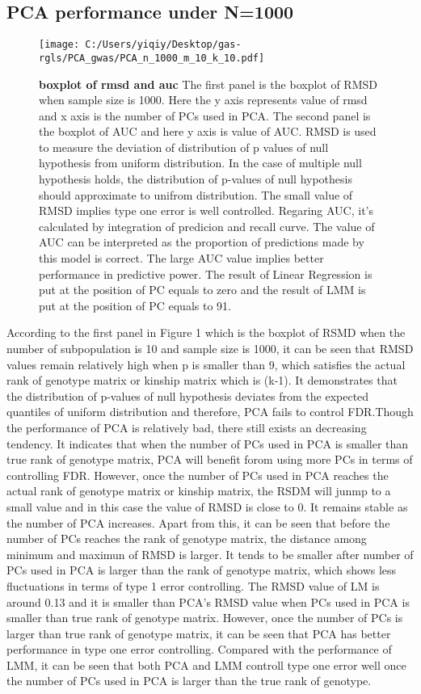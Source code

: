 \documentclass[12pt]{article}
\begin{document}
\subsection{PCA performance under N=1000}
\begin{figure}[bp!]
  \centering
  \texttt{[image: C:/Users/yiqiy/Desktop/gas-rgls/PCA\_gwas/PCA\_n\_1000\_m\_10\_k\_10.pdf]}
  \caption{
    {\bf boxplot of rmsd and auc}
    The first panel is the boxplot of RMSD when sample size is 1000. Here the y axis represents value of rmsd and x axis is the number of PCs used in PCA.
    The second panel is the boxplot of AUC and here y axis is value of AUC. RMSD is used to measure the deviation of distribution of p values of null hypothesis from uniform distribution. In the case of multiple null hypothesis holds, the distribution of p-values of null hypothesis should approximate to unifrom distribution. The small value of RMSD implies type one error is well controlled. Regaring AUC, it's calculated by integration of predicion and recall curve. The value of AUC can be interpreted as the proportion of predictions made by this model is correct. The large AUC value implies better performance in predictive power. The result of Linear Regression is put at the position of PC equals to zero and the result of LMM is put at the position of PC equals to 91.}
  \label{fig:example}
\end{figure}

According to the first panel in Figure 1 which is the boxplot of RSMD when the number of subpopulation is 10 and sample size is 1000, it can be seen that RMSD values remain relatively high when p is smaller than 9, which satisfies the actual rank of genotype matrix or kinship matrix which is (k-1). It demonstrates that the distribution of p-values of null hypothesis deviates from the expected quantiles of uniform distribution and therefore, PCA fails to control FDR.Though the performance of PCA is relatively bad, there still exists an decreasing tendency. It indicates that when the number of PCs used in PCA is smaller than true rank of genotype matrix, PCA will benefit forom using more PCs in terms of controlling FDR. However, once the number of PCs used in PCA reaches the actual rank of genotype matrix or kinship matrix, the RSDM will junmp to a small value and in this case the value of RMSD is close to 0. It remains stable as the number of PCA increases. Apart from this, it can be seen that before the number of PCs reaches the rank of genotype matrix, the distance among minimum and maximun of RMSD is larger. It tends to be smaller after number of PCs used in PCA is larger than the rank of genotype matrix, which shows less fluctuations in terms of type 1 error controlling. The RMSD value of LM is around 0.13 and it is smaller than PCA's RMSD value when PCs used in PCA is smaller than true rank of genotype matrix. However, once the number of PCs is larger than true rank of genotype matrix, it can be seen that PCA has better performance in type one error controlling. Compared with the performance of LMM, it can be seen that both PCA and LMM controll type one error well once the number of PCs used in PCA is larger than the true rank of genotype.\\
\end{document}
